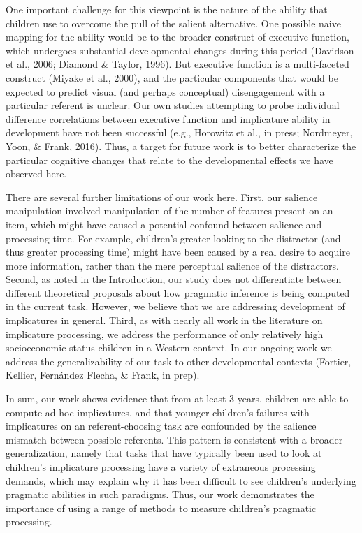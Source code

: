 \documentclass[man]{apa6}
\theoremstyle{definition}
\theoremstyle{definition}
\theoremstyle{definition}
\theoremstyle{remark}
\begin{document}
One important challenge for this viewpoint is the nature of the ability
that children use to overcome the pull of the salient alternative. One
possible naive mapping for the ability would be to the broader construct
of executive function, which undergoes substantial developmental changes
during this period (Davidson et al., 2006; Diamond \& Taylor, 1996). But
executive function is a multi-faceted construct (Miyake et al., 2000),
and the particular components that would be expected to predict visual
(and perhaps conceptual) disengagement with a particular referent is
unclear. Our own studies attempting to probe individual difference
correlations between executive function and implicature ability in
development have not been successful (e.g., Horowitz et al., in press;
Nordmeyer, Yoon, \& Frank, 2016). Thus, a target for future work is to
better characterize the particular cognitive changes that relate to the
developmental effects we have observed here.

There are several further limitations of our work here. First, our
salience manipulation involved manipulation of the number of features
present on an item, which might have caused a potential confound between
salience and processing time. For example, children's greater looking to
the distractor (and thus greater processing time) might have been caused
by a real desire to acquire more information, rather than the mere
perceptual salience of the distractors. Second, as noted in the
Introduction, our study does not differentiate between different
theoretical proposals about how pragmatic inference is being computed in
the current task. However, we believe that we are addressing development
of implicatures in general. Third, as with nearly all work in the
literature on implicature processing, we address the performance of only
relatively high socioeconomic status children in a Western context. In
our ongoing work we address the generalizability of our task to other
developmental contexts (Fortier, Kellier, Fernández Flecha, \& Frank, in
prep).

In sum, our work shows evidence that from at least 3 years, children are
able to compute ad-hoc implicatures, and that younger children's
failures with implicatures on an referent-choosing task are confounded
by the salience mismatch between possible referents. This pattern is
consistent with a broader generalization, namely that tasks that have
typically been used to look at children's implicature processing have a
variety of extraneous processing demands, which may explain why it has
been difficult to see children's underlying pragmatic abilities in such
paradigms. Thus, our work demonstrates the importance of using a range
of methods to measure children's pragmatic processing.
\end{document}
